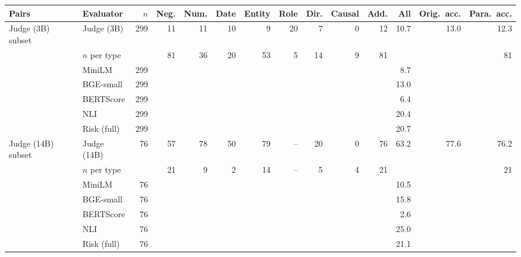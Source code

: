 \begin{tabular}{llrrrrrrrrrrrr}
\toprule
Pairs & Evaluator & $n$ & Neg. & Num. & Date & Entity & Role & Dir. & Causal & Add. & All & Orig.\ acc. & Para.\ acc. \\
\midrule
Judge (3B) subset & Judge (3B) & 299 & 11 & 11 & 10 & 9 & 20 & 7 & 0 & 12 & 10.7 & 13.0 & 12.3 \\
 & $n$ per type & & 81 & 36 & 20 & 53 & 5 & 14 & 9 & 81 & & & 81 \\
 & MiniLM & 299 &  &  &  &  &  &  &  &  & 8.7 & & \\
 & BGE-small & 299 &  &  &  &  &  &  &  &  & 13.0 & & \\
 & BERTScore & 299 &  &  &  &  &  &  &  &  & 6.4 & & \\
 & NLI & 299 &  &  &  &  &  &  &  &  & 20.4 & & \\
 & Risk (full) & 299 &  &  &  &  &  &  &  &  & 20.7 & & \\
\midrule
Judge (14B) subset & Judge (14B) & 76 & 57 & 78 & 50 & 79 & -- & 20 & 0 & 76 & 63.2 & 77.6 & 76.2 \\
 & $n$ per type & & 21 & 9 & 2 & 14 & -- & 5 & 4 & 21 & & & 21 \\
 & MiniLM & 76 &  &  &  &  &  &  &  &  & 10.5 & & \\
 & BGE-small & 76 &  &  &  &  &  &  &  &  & 15.8 & & \\
 & BERTScore & 76 &  &  &  &  &  &  &  &  & 2.6 & & \\
 & NLI & 76 &  &  &  &  &  &  &  &  & 25.0 & & \\
 & Risk (full) & 76 &  &  &  &  &  &  &  &  & 21.1 & & \\
\bottomrule
\end{tabular}
